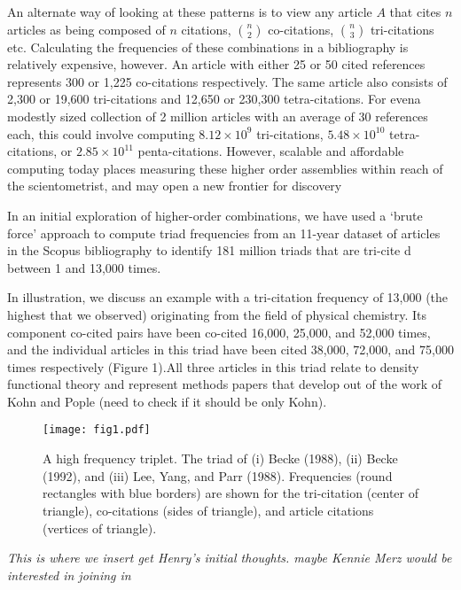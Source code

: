\documentclass[notitlepage]{report}
\begin{document}
An alternate way of looking at these patterns is to view any article $A$ that cites $n$ articles as being composed of $n$ citations, $n\choose2$ co-citations, $n\choose3$ tri-citations etc. Calculating the frequencies of these combinations in a bibliography is relatively expensive, however. An article with either 25 or 50 cited references represents 300 or 1,225 co-citations respectively. The same article also consists of  2,300 or 19,600 tri-citations and  12,650 or  230,300 tetra-citations. For evena modestly sized collection of 2 million articles with an average of 30 references each, this could involve computing $8.12\times10^9$ tri-citations, $5.48\times10^{10}$ tetra-citations, or $2.85\times10^{11}$ penta-citations.  However, scalable and affordable computing today places measuring these higher order assemblies within reach of the scientometrist, and may open a new frontier for discovery

In an initial exploration of higher-order combinations, we have used a `brute force' approach to compute triad frequencies from an 11-year dataset of articles in the Scopus bibliography to identify 181 million triads that are tri-cite d between 1 and 13,000 times. 

In illustration, we discuss an example with a tri-citation frequency of 13,000 (the highest that we observed) originating from the field of physical chemistry. Its component co-cited pairs have been co-cited 16,000, 25,000, and 52,000 times, and the individual articles in this triad have been cited 38,000, 72,000, and 75,000 times respectively (Figure 1).All  three articles in this triad relate to density functional theory and represent methods papers that develop out of the work of Kohn and Pople (need to check if it should be only Kohn).

\begin{figure}[h!]
\begin{center}
\texttt{[image: fig1.pdf]}%
\end{center}
\caption{A high frequency triplet. The triad of (i) Becke (1988), (ii) Becke (1992), and (iii) Lee, Yang, and Parr (1988).  Frequencies (round rectangles with blue borders) are shown for the tri-citation (center of triangle), co-citations (sides of triangle), and 
article citations (vertices of triangle). 
}
\label{fig:fig2}
\end{figure}


\emph{This is where we insert get Henry's initial thoughts. maybe Kennie Merz would be interested in joining in}
\end{document}
